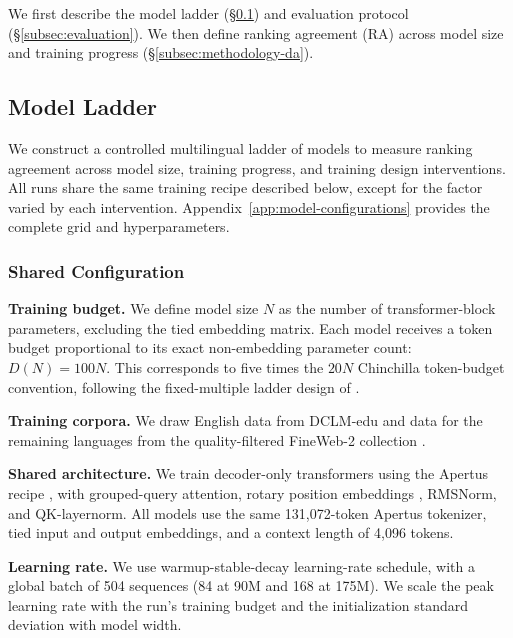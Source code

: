 We first describe the model ladder (\S\ref{subsec:models}) and evaluation protocol (\S\ref{subsec:evaluation}). We then define ranking agreement (RA) across model size and training progress (\S\ref{subsec:methodology-da}). %

\subsection{Model Ladder}
\label{subsec:models}

We construct a controlled multilingual ladder of \nmodels models to measure ranking agreement across model size, training progress, and training design interventions. 
All runs share the same training recipe described below, except for the factor varied by each intervention. 
Appendix~\ref{app:model-configurations} provides the complete grid and hyperparameters.

\subsubsection{Shared Configuration}

\textbf{Training budget.}
We define model size $N$ as the number of transformer-block parameters, excluding the tied embedding matrix. Each model receives a token budget proportional to its exact non-embedding parameter count:
$D(N) = 100N.$
This corresponds to five times the $20N$ Chinchilla token-budget convention, %
following the fixed-multiple ladder design of 
\citet{magnusson_datadecide_2025}. 

\textbf{Training corpora.}
We draw English data from DCLM-edu \citep{li_datacomp-lm_2025} and data for the remaining languages from the quality-filtered FineWeb-2 collection \citep{penedo_fineweb2_2025,messmer_enhancing_2026}. %

\textbf{Shared architecture.} We train decoder-only transformers using the Apertus recipe \citep{apertus_apertus_2025}, with grouped-query attention,
rotary position embeddings \citep{su_roformer_2023}, RMSNorm, and QK-layernorm. All models use the same 131,072-token Apertus tokenizer, tied input and output embeddings, and a context length of 4,096 tokens. 

\textbf{Learning rate.}
We use warmup-stable-decay learning-rate schedule, %
with a global batch of 504 sequences (84 at 90M and 168 at 175M). We scale the peak learning rate with the run's training budget and the initialization standard deviation with model width.

